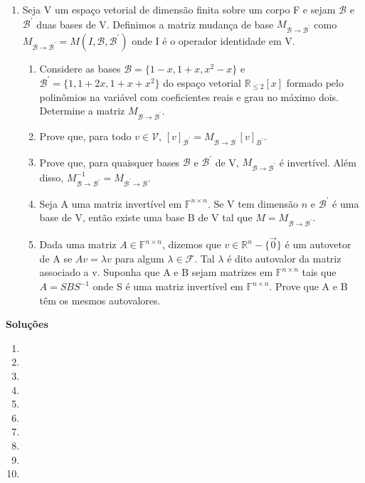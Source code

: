 \documentclass[12pt]{article}
\begin{document}
\begin{enumerate}
    \item Seja V um espaço vetorial de dimensão finita sobre um corpo F e sejam $\mathcal{B}$ e $\mathcal{B}^{\prime}$ duas bases de V. Definimos a matriz mudança de base $M_{\mathcal{B}\rightarrow\mathcal{B^{\prime}}}$ como $M_{\mathcal{B}\rightarrow\mathcal{B^{\prime}}} = M(I,\mathcal{B},\mathcal{B}^{\prime})$ onde I é o operador identidade em V.
    \begin{enumerate}
        \item Considere as bases $\mathcal{B}=\{1-x, 1+x, x^{2}-x\}$ e $\mathcal{B}^{\prime}=\{1, 1+2x, 1+x+x^{2}\}$ do espaço vetorial $\mathbb{R}_{\le2}[x]$ formado pelo polinômios na variável com coeficientes reais e grau no máximo dois. Determine a matriz $M_{\mathcal{B}\rightarrow\mathcal{B^{\prime}}}$.
        \item Prove que, para todo $v \in \mathcal{V}$, $[v]_{\mathcal{B}^{\prime}} = M_{\mathcal{B}\rightarrow\mathcal{B}^{\prime}}[v]_{B^{\prime}}$.
        \item Prove que, para quaisquer bases $\mathcal{B}$ e $\mathcal{B}^{\prime}$ de V, $M_{\mathcal{B}\rightarrow\mathcal{B^{\prime}}}$ é invertível. Além disso, $M_{\mathcal{B}\rightarrow\mathcal{B^{\prime}}}^{-1} = M_{\mathcal{B^{\prime}}\rightarrow\mathcal{B}}$.
        \item Seja A uma matriz invertível em $\mathbb{F}^{n\times n}$. Se V tem dimensão $n$ e $\mathcal{B}^{\prime}$ é uma base de V, então existe uma base B de V tal que $M=M_{\mathcal{B}\rightarrow\mathcal{B^{\prime}}}$.
        \item Dada uma matriz $A \in \mathbb{F}^{n\times n}$, dizemos que $v \in \mathbb{R}^{n}-\{\vec{0}\}$ é um autovetor de A se $Av=\lambda v$ para algum $\lambda \in \mathcal{F}$. Tal $\lambda$ é dito autovalor da matriz associado a v. Suponha que A e B sejam matrizes em $\mathbb{F}^{n\times n}$ tais que $A=SBS^{-1}$ onde S é uma matriz invertível em $\mathbb{F}^{n\times n}$. Prove que A e B têm os mesmos autovalores.
    \end{enumerate}

\end{enumerate}

\begin{center}
    \textbf{Soluções}
\end{center}

\begin{enumerate}
    \item[\textbf{E1}] 
    \item[\textbf{E2}] 
    \item[\textbf{E3}] 
    \item[\textbf{E4}] 
    \item[\textbf{E5}] 
    \item[\textbf{E6}] 
    \item[\textbf{E7}] 
    \item[\textbf{E8}] 
    \item[\textbf{E9}] 
    \item[\textbf{E10}]
\end{enumerate}
\end{document}
